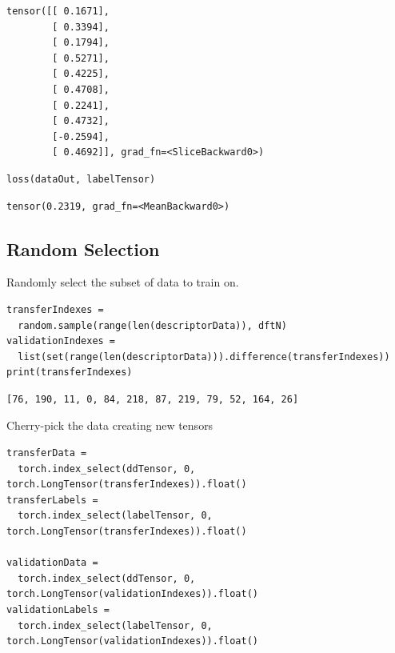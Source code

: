\begin{verbatim}
tensor([[ 0.1671],
        [ 0.3394],
        [ 0.1794],
        [ 0.5271],
        [ 0.4225],
        [ 0.4708],
        [ 0.2241],
        [ 0.4732],
        [-0.2594],
        [ 0.4692]], grad_fn=<SliceBackward0>)
\end{verbatim}

\begin{verbatim}
loss(dataOut, labelTensor)
\end{verbatim}

\begin{verbatim}
tensor(0.2319, grad_fn=<MeanBackward0>)
\end{verbatim}

\hypertarget{random-selection}{%
\subsection{Random Selection}\label{pysipfenntutorial2:random-selection}}

Randomly select the subset of data to train on.

\begin{verbatim}
transferIndexes = 
  random.sample(range(len(descriptorData)), dftN)
validationIndexes = 
  list(set(range(len(descriptorData))).difference(transferIndexes))
print(transferIndexes)
\end{verbatim}

\begin{verbatim}
[76, 190, 11, 0, 84, 218, 87, 219, 79, 52, 164, 26]
\end{verbatim}

Cherry-pick the data creating new tensors

\begin{verbatim}
transferData = 
  torch.index_select(ddTensor, 0, torch.LongTensor(transferIndexes)).float()
transferLabels = 
  torch.index_select(labelTensor, 0, torch.LongTensor(transferIndexes)).float()

validationData = 
  torch.index_select(ddTensor, 0, torch.LongTensor(validationIndexes)).float()
validationLabels = 
  torch.index_select(labelTensor, 0, torch.LongTensor(validationIndexes)).float()
\end{verbatim}

